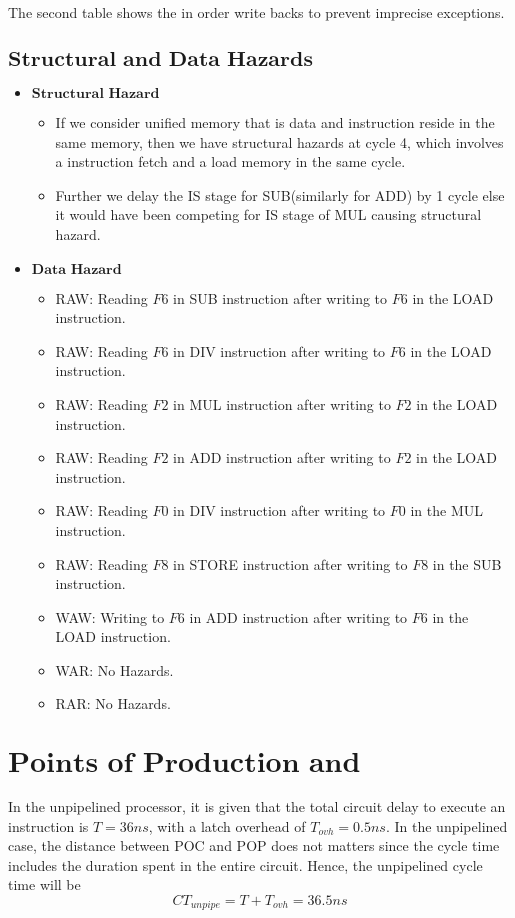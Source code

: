 \documentclass{tufte-handout}
\begin{document}
	\paragraph{} The second table shows the in order write backs to prevent imprecise exceptions. 
 \subsection{$\textbf{Structural and Data Hazards}$}
  	\begin{itemize}
		\item $\textbf{Structural Hazard}$
			\begin{itemize}
				\item If we consider unified memory that is data and instruction reside in the same memory, then we have structural hazards at cycle 4, which involves a instruction fetch and a load memory in the same cycle.
				\item Further we delay the IS stage  for SUB(similarly for ADD) by 1 cycle else it would have been competing for IS stage of MUL causing structural hazard.
			\end{itemize}
		\item $\textbf{Data Hazard}$
			\begin{itemize}
				\item RAW: Reading $F6$ in SUB instruction after writing to $F6$ in the LOAD instruction.
				\item RAW: Reading $F6$ in DIV instruction after writing to $F6$ in the LOAD instruction.
				\item RAW: Reading $F2$ in MUL instruction after writing to $F2$ in the LOAD instruction.
				\item RAW: Reading $F2$ in ADD instruction after writing to $F2$ in the LOAD instruction.
				\item RAW: Reading $F0$ in DIV instruction after writing to $F0$ in the MUL instruction.
				\item RAW: Reading $F8$ in STORE instruction after writing to $F8$ in the SUB instruction.
				\item WAW: Writing to $F6$ in ADD instruction after writing to $F6$ in the LOAD instruction.
				\item WAR: No Hazards.
				\item RAR: No Hazards.
			\end{itemize}
	\end{itemize}


  \section{$\textbf{Points of Production and Consumption}$}
    In the unpipelined processor, it is given that the total circuit delay to execute an instruction is $T = 36 ns$, with a latch overhead of $T_{ovh} = 0.5 ns$. In the unpipelined case, the distance between POC and POP does not matters since the cycle time includes the duration spent in the entire circuit. Hence, the unpipelined cycle time will be
	\[
		CT_{unpipe} = T + T_{ovh} = 36.5 ns
	\]
\end{document}
